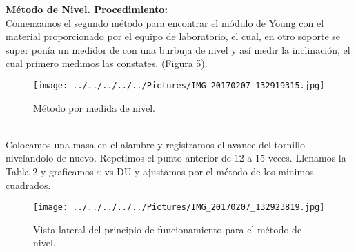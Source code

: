 \documentclass[10pt,a4paper]{article}
\begin{document}
\medskip
\textbf{M\'{e}todo de Nivel. Procedimiento:}\\ 
Comenzamos el segundo m\'{e}todo para encontrar el m\'{o}dulo de Young con el material proporcionado por el equipo de laboratorio, el cual, en otro soporte se super pon\'{i}a un medidor de con una burbuja de nivel y as\'{i} medir la inclinaci\'{o}n, el cual primero medimos las constates.  (Figura 5).\\
\begin{figure}[hbtp]
\centering
\texttt{[image: ../../../../../Pictures/IMG\_20170207\_132919315.jpg]}
\caption{ M\'{e}todo por medida de nivel.}
\end{figure}
\\
Colocamos una masa en el alambre y registramos el avance del tornillo nivelandolo de nuevo. Repetimos el punto anterior de 12 a 15 veces. Llenamos la Tabla 2 y graficamos $\varepsilon$ vs DU y ajustamos por el m\'{e}todo de los minimos cuadrados. \\
\begin{figure}[hbtp]
\centering
\texttt{[image: ../../../../../Pictures/IMG\_20170207\_132923819.jpg]}
\caption{Vista lateral del principio de funcionamiento para el m\'{e}todo de nivel.}
\end{figure}
\end{document}
